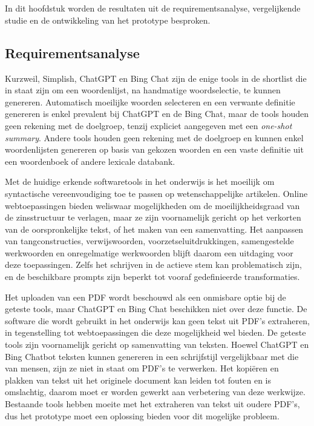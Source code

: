 \chapter{}%
\label{ch:resultaten}

In dit hoofdstuk worden de resultaten uit de requirementsanalyse, vergelijkende studie en de ontwikkeling van het prototype besproken. 

\section{Requirementsanalyse}

Kurzweil, Simplish, ChatGPT en Bing Chat zijn de enige tools in de shortlist die in staat zijn om een woordenlijst, na handmatige woordselectie, te kunnen genereren. Automatisch moeilijke woorden selecteren en een verwante definitie genereren is enkel prevalent bij ChatGPT en de Bing Chat, maar de tools houden geen rekening met de doelgroep, tenzij expliciet aangegeven met een \textit{one-shot summary}. Andere tools houden geen rekening met de doelgroep en kunnen enkel woordenlijsten genereren op basis van gekozen woorden en een vaste definitie uit een woordenboek of andere lexicale databank.

\medspace

Met de huidige erkende softwaretools in het onderwijs is het moeilijk om syntactische vereenvoudiging toe te passen op wetenschappelijke artikelen. Online webtoepassingen bieden weliswaar mogelijkheden om de moeilijkheidsgraad van de zinsstructuur te verlagen, maar ze zijn voornamelijk gericht op het verkorten van de oorspronkelijke tekst, of het maken van een samenvatting. Het aanpassen van tangconstructies, verwijswoorden, voorzetseluitdrukkingen, samengestelde werkwoorden en onregelmatige werkwoorden blijft daarom een uitdaging voor deze toepassingen. Zelfs het schrijven in de actieve stem kan problematisch zijn, en de beschikbare prompts zijn beperkt tot vooraf gedefinieerde transformaties.

\medspace

Het uploaden van een PDF wordt beschouwd als een onmisbare optie bij de geteste tools, maar ChatGPT en Bing Chat beschikken niet over deze functie. De software die wordt gebruikt in het onderwijs kan geen tekst uit PDF's extraheren, in tegenstelling tot webtoepassingen die deze mogelijkheid wel bieden. De geteste tools zijn voornamelijk gericht op samenvatting van teksten. Hoewel ChatGPT en Bing Chatbot teksten kunnen genereren in een schrijfstijl vergelijkbaar met die van mensen, zijn ze niet in staat om PDF's te verwerken. Het kopiëren en plakken van tekst uit het originele document kan leiden tot fouten en is omslachtig, daarom moet er worden gewerkt aan verbetering van deze werkwijze. Bestaande tools hebben moeite met het extraheren van tekst uit oudere PDF's, dus het prototype moet een oplossing bieden voor dit mogelijke probleem.

